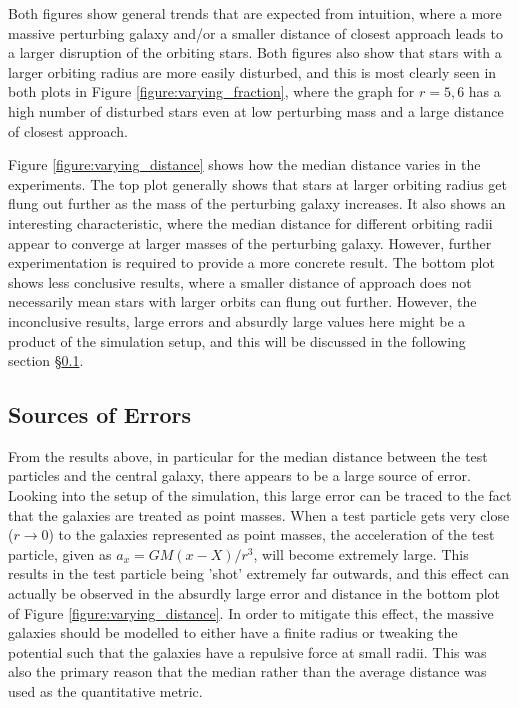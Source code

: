 \documentclass[twoside,twocolumn]{article}
\begin{document}
        Both figures show general trends that are expected from intuition, where a more massive perturbing galaxy and/or a smaller distance of closest approach leads to a larger disruption of the orbiting stars. Both figures also show that stars with a larger orbiting radius are more easily disturbed, and this is most clearly seen in both plots in Figure \ref{figure:varying_fraction}, where the graph for $r = 5, 6$ has a high number of disturbed stars even at low perturbing mass and a large distance of closest approach. 
        
        Figure \ref{figure:varying_distance} shows how the median distance varies in the experiments. The top plot generally shows that stars at larger orbiting radius get flung out further as the mass of the perturbing galaxy increases. It also shows an interesting characteristic, where the median distance for different orbiting radii appear to converge at larger masses of the perturbing galaxy. However, further experimentation is required to provide a more concrete result. The bottom plot shows less conclusive results, where a smaller distance of approach does not necessarily mean stars with larger orbits can flung out further. However, the inconclusive results, large errors and absurdly large values here might be a product of the simulation setup, and this will be discussed in the following section \S \ref{section:error}.  
        
         
    \subsection{Sources of Errors}
        \label{section:error}

        From the results above, in particular for the median distance between the test particles and the central galaxy, there appears to be a large source of error. Looking into the setup of the simulation, this large error can be traced to the fact that the galaxies are treated as point masses. When a test particle gets very close ($r \to 0$) to the galaxies represented as point masses, the acceleration of the test particle, given as $a_{x} = GM(x - X) / r^3$, will become extremely large. This results in the test particle being 'shot' extremely far outwards, and this effect can actually be observed in the absurdly large error and distance in the bottom plot of Figure \ref{figure:varying_distance}. In order to mitigate this effect, the massive galaxies should be modelled to either have a finite radius or tweaking the potential such that the galaxies have a repulsive force at small radii. This was also the primary reason that the median rather than the average distance was used as the quantitative metric. 
\end{document}
